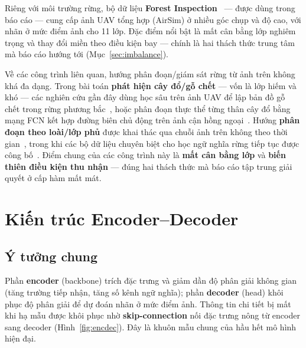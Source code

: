 Riêng với môi trường rừng, bộ dữ liệu \textbf{Forest Inspection}~\cite{forestdataset}
--- được dùng trong báo cáo --- cung cấp ảnh UAV tổng hợp (AirSim) ở nhiều góc chụp và
độ cao, với nhãn ở mức điểm ảnh cho 11 lớp. Đặc điểm nổi bật là mất cân bằng lớp
nghiêm trọng và thay đổi miền theo điều kiện bay --- chính là hai thách thức trung tâm
mà báo cáo hướng tới (Mục~\ref{sec:imbalance}).

Về các công trình liên quan, hướng phân đoạn/giám sát rừng từ ảnh trên không khá đa
dạng. Trong bài toán \textbf{phát hiện cây đổ/gỗ chết} --- vốn là lớp hiếm và khó ---
các nghiên cứu gần đây dùng học sâu trên ảnh UAV để lập bản đồ gỗ chết trong rừng
phương bắc~\cite{deadwood2025}, hoặc phân đoạn thực thể từng thân cây đổ bằng mạng FCN
kết hợp đường biên chủ động trên ảnh cận hồng ngoại~\cite{fallentrees2021}. Hướng
\textbf{phân đoạn theo loài/lớp phủ} được khai thác qua chuỗi ảnh trên không theo thời
gian~\cite{treeseg2024}, trong khi các bộ dữ liệu chuyên biệt cho học ngữ nghĩa rừng
tiếp tục được công bố~\cite{forestsemantic2024}. Điểm chung của các công trình này là
\textbf{mất cân bằng lớp} và \textbf{biến thiên điều kiện thu nhận} --- đúng hai thách
thức mà báo cáo tập trung giải quyết ở cấp hàm mất mát.

\section{Kiến trúc Encoder--Decoder}

\subsection{Ý tưởng chung}
Phần \textbf{encoder} (backbone) trích đặc trưng và giảm dần độ phân giải không gian
(tăng trường tiếp nhận, tăng số kênh ngữ nghĩa); phần \textbf{decoder} (head) khôi phục
độ phân giải để dự đoán nhãn ở mức điểm ảnh. Thông tin chi tiết bị mất khi hạ mẫu được
khôi phục nhờ \textbf{skip-connection} nối đặc trưng nông từ encoder sang decoder
(Hình~\ref{fig:encdec}). Đây là khuôn mẫu chung của hầu hết mô hình hiện đại.

